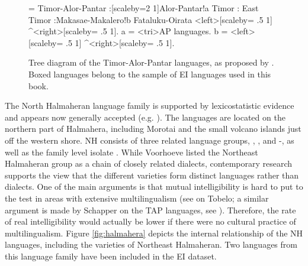 \begin{figure}
\begin{center}
\begin{footnotesize}
\jtree[xunit=5em,yunit=2em]
\! = {Timor-Alor-Pantar}
:[scaleby=2 1]{Alor-Pantar}!a {Timor}
:{} {East Timor}
:{Makasae-Makalero}!b {Fataluku-Oirata}
<left>[scaleby= .5 1]{} ^<right>[scaleby= .5 1]{}.
\!a = <tri>{AP languages}{}.
\!b = <left>[scaleby= .5 1]{} ^<right>[scaleby= .5 1]{}.
\endjtree
\end{footnotesize}
\end{center}
\caption[The Timor-Alor-Pantar languages]{Tree diagram of the Timor-Alor-Pantar languages, as proposed by \citealt{schapper2014intro}. Boxed languages belong to the sample of EI languages used in this book.}\label{fig:timor-alor-pantar}
\end{figure}
\FloatBarrier

The North Halmaheran language family is supported by lexicostatistic evidence and appears now generally accepted (e.g. \citealt{Voorhoeve1994;reesink2005west}). The languages are located on the northern part of Halmahera, including Morotai and the small volcano islands just off the western shore. NH consists of three related language groups, , , and -, as well as the family level isolate  \citep{Voorhoeve1994}. While Voorhoeve listed the Northeast Halmaheran group as a chain of closely related dialects, contemporary research supports the view that the different varieties  form distinct languages rather than dialects. One of the main arguments is that mutual intelligibility is hard to put to the test in areas with extensive multilingualism (see \citealt{holton2003tobelo} on Tobelo; a similar argument is made by Schapper on the TAP languages, see \citealt[3]{schapper2014intro}). Therefore, the rate of real intelligibility would actually be lower if there were no cultural practice of multilingualism. Figure \ref{fig:halmahera} depicts the internal relationship of the NH languages, including the varieties of Northeast Halmaheran. Two languages from this language family have been included in the EI dataset.

